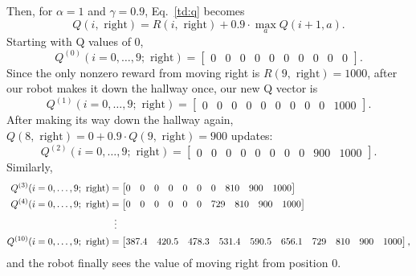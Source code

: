 Then, for $\alpha=1$ and $\gamma = 0.9$, Eq.~\ref{td:q} becomes
\begin{equation}
  Q(i, \text{ right}) = R(i, \text{ right})
  + 0.9 \cdot \max_a Q(i+1, a).
\end{equation}
Starting with Q values of 0,
\begin{equation}
  Q^{(0)}(i = 0, \ldots, 9; \text{ right}) =
  \begin{bmatrix} 0 & 0 & 0 & 0 & 0 & 0 & 0 & 0 & 0 & 0 \end{bmatrix}.
\end{equation}
  Since the only nonzero
reward from moving right is $R(9, \text{ right}) = 1000$, after our
robot makes it down the hallway once, our new Q vector is
\begin{equation}
  Q^{(1)}(i = 0, \ldots, 9; \text{ right}) =
  \begin{bmatrix} 0 & 0 & 0 & 0 & 0 & 0 & 0 & 0 & 0 & 1000 \end{bmatrix}.
\end{equation}
After making its way down the hallway again,
$Q(8, \text{ right}) = 0 + 0.9 \cdot Q(9, \text{ right}) = 900$
updates:
\begin{equation}
  Q^{(2)}(i = 0, \ldots, 9; \text{ right}) =
  \begin{bmatrix}
    0 & 0 & 0 & 0 & 0 & 0 & 0 & 0 & 900 & 1000
  \end{bmatrix}.
\end{equation}
Similarly,
\begin{align}
  Q^{(3)}(i = 0, \ldots, 9; \text{ right})   & =
  \begin{bmatrix}
    0 & 0 & 0 & 0 & 0 & 0 & 0 & 810 & 900 & 1000
  \end{bmatrix}                 \\
  Q^{(4)}(i = 0, \ldots, 9; \text{ right})   & =
  \begin{bmatrix}
    0 & 0 & 0 & 0 & 0 & 0 & 729 & 810 & 900 & 1000
  \end{bmatrix}               \\
                                             & \vdotswithin{=} \\
  Q^{(10)}(i = 0, \ldots, 9;  \text{ right}) & =
  \begin{bmatrix}
    387.4 & 420.5 & 478.3 & 531.4 & 590.5 & 656.1 & 729 & 810
          & 900   & 1000
  \end{bmatrix},
\end{align}
and the robot finally sees the value of moving right from position 0.


